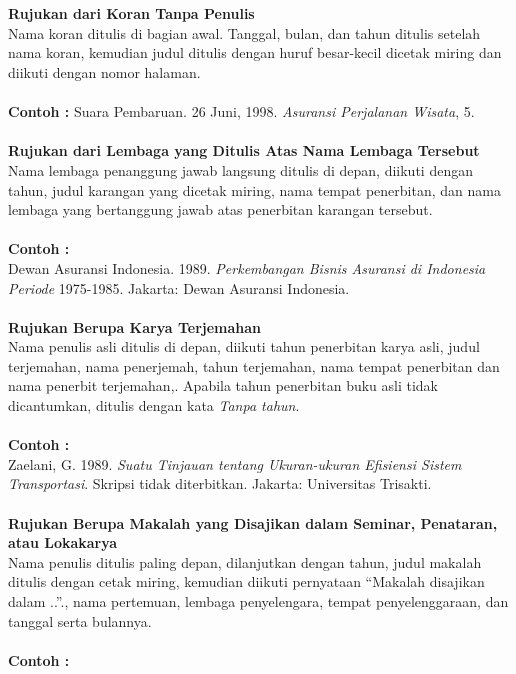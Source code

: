 \\
\\
\textbf{Rujukan dari Koran Tanpa Penulis}
\\
Nama		koran	ditulis	di	bagian	awal.	Tanggal,	bulan,	dan	tahun	ditulis	setelah	nama	koran,	
kemudian	judul	ditulis	dengan	huruf	besar-kecil	dicetak	miring	dan	diikuti	dengan	nomor	halaman.
\\
\\
\textbf{Contoh :}
Suara	Pembaruan.	26	Juni,	1998. \textit{Asuransi	Perjalanan	Wisata},	5.	
\\
\\
\textbf{Rujukan dari Lembaga yang Ditulis Atas Nama Lembaga Tersebut}
\\
Nama	 lembaga	 penanggung	 jawab	 langsung	 ditulis	 di	 depan,	 diikuti	 dengan	 tahun,	 judul	karangan	 yang	 dicetak	 miring,	 nama	 tempat	 penerbitan,	 dan	 nama	 lembaga	 yang	bertanggung	jawab	atas	penerbitan	karangan	tersebut.
\\
\\
\textbf{Contoh :}
\\
Dewan	Asuransi	Indonesia.	1989. \textit{Perkembangan	Bisnis	Asuransi	di	Indonesia	Periode}	1975-1985.	Jakarta:	Dewan	Asuransi	Indonesia.
\\
\\
\textbf{Rujukan Berupa Karya Terjemahan}\\
Nama	 penulis	asli	 ditulis	 di	 depan,	 diikuti	 tahun	 penerbitan	 karya	asli,	judul	 terjemahan,	nama	 penerjemah,	 tahun	 terjemahan,	 nama	 tempat	 penerbitan	 dan	 nama penerbit	terjemahan,.	 Apabila	 tahun	 penerbitan	 buku	 asli	 tidak	 dicantumkan,	 ditulis	 dengan	 kata \textit{Tanpa	tahun}.
\\
\\
\textbf{Contoh :} \\
Zaelani,	 G.	 1989. \textit{Suatu	 Tinjauan	 tentang	 Ukuran-ukuran	 Efisiensi	 Sistem	 Transportasi}.	Skripsi	tidak	diterbitkan.	Jakarta:	Universitas	Trisakti.
\\
\\
\textbf{Rujukan Berupa Makalah yang Disajikan dalam Seminar, Penataran, atau Lokakarya}
\\
Nama penulis ditulis paling depan, dilanjutkan dengan tahun, judul makalah ditulis dengan cetak miring, kemudian diikuti pernyataan “Makalah disajikan dalam ..”., nama pertemuan, lembaga penyelengara, tempat penyelenggaraan, dan tanggal serta bulannya.
\\
\\
\textbf{Contoh :}
